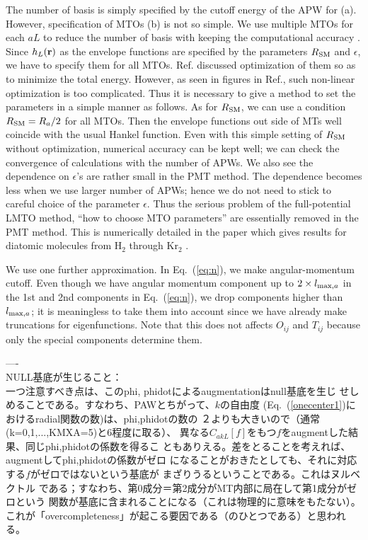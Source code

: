 \documentclass[twocolumn,showpacs,preprintnumbers,amsmath,amssymb,floatfix]{revtex4-1}
\newcommand{\bfr}{{\bf r}}
\newcommand{\req}[1]{\mbox{Eq.~\!(\ref{#1})}}
\def\RSM{R_{\rm SM}}
\def\CakL{C_{akL}}
\def\RSM{R_{\rm SM}}
\def\CakL{C_{akL}}
\begin{document}
The number of basis is simply specified by the cutoff energy of the APW
for (a). However, specification of MTOs (b) is not so simple.  
We use multiple MTOs for each $aL$ to reduce the number of basis with 
keeping the computational accuracy \cite{pmt1}.
Since $h_L(\bfr)$ as the envelope functions are specified 
by the parameters $\RSM$ and $\epsilon$, we have to specify them for
all MTOs. Ref.\cite{lmfchap} discussed optimization of them so as
to minimize the total energy. However, as seen in figures in
Ref.\cite{lmfchap}, such non-linear optimization is too complicated.
Thus it is necessary to give a method to set the parameters 
in a simple manner as follows. 
As for $\RSM$, we can use a condition $\RSM= R_a/2$ for all MTOs. 
Then the envelope functions out side of MTs well coincide with
the usual Hankel function. 
Even with this simple setting of $\RSM$ without optimization,
numerical accuracy can be kept well; we can check the
convergence of calculations with the number of APWs.
We also see the dependence on $\epsilon$'s are rather small
in the PMT method. The dependence becomes less when we use larger
number of APWs; hence we do not need to stick to careful choice of
the parameter $\epsilon$.
Thus the serious problem of the full-potential LMTO method, ``how
to choose MTO parameters'' are essentially removed in the PMT
method. This is numerically detailed in the paper which gives results for
diatomic molecules from H$_2$ through Kr$_2$ \cite{kotani_linearized_2013}.

We use one further approximation. In \req{eq:n}, we make angular-momentum cutoff.
Even though we have angular momentum component up to 
$2\times l_{{\rm max},a}$ in the 1st and 2nd components in \req{eq:n}, 
we drop components higher than $l_{{\rm max},a}$; 
it is meaningless to take them into account since we have already make 
truncations for eigenfunctions. Note that this does not affects $O_{ij}$
and $T_{ij}$ because only the special components determine them.

----\\
NULL基底が生じること：\\
一つ注意すべき点は、このphi, phidotによるaugmentationはnull基底を生じ
せしめることである。すなわち、PAWとちがって、$k$の自由度
(\req{onecenter1}におけるradial関数の数)は、phi,phidotの数の
２よりも大きいので（通常(k=0,1,...,KMXA=5)と6程度に取る）、
異なる$\CakL[f]$をもつ$f$をaugmentした結果、同じphi,phidotの係数を得るこ
ともありえる。差をとることを考えれば、augmentしてphi,phidotの係数がゼロ
になることがおきたとしても、それに対応する$f$がゼロではないという基底が
まざりうるということである。これはヌルベクトル
である；すなわち、第0成分＝第2成分がMT内部に局在して第1成分がゼロという
関数が基底に含まれることになる（これは物理的に意味をもたない）。
これが「overcompleteness」が起こる要因である（のひとつである）と思われる。\\
\end{document}
